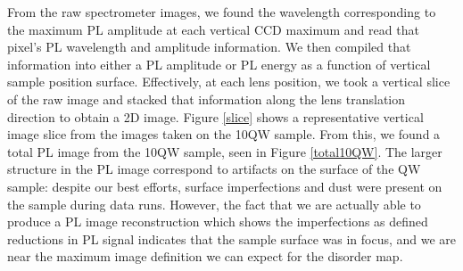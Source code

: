 \indent From the raw spectrometer images, we found the wavelength corresponding to the maximum PL amplitude at each vertical CCD maximum and read that pixel's PL wavelength and amplitude information. We then compiled that information into either a PL amplitude or PL energy as a function of vertical sample position surface. Effectively, at each lens position, we took a vertical slice of the raw image and stacked that information along the lens translation direction to obtain a 2D image. Figure \ref{slice} shows a representative vertical image slice from the images taken on the 10QW sample. From this, we found a total PL image from the 10QW sample, seen in Figure \ref{total10QW}. The larger structure in the PL image correspond to artifacts on the surface of the QW sample: despite our best efforts, surface imperfections and dust were present on the sample during data runs. However, the fact that we are actually able to produce a PL image reconstruction which shows the imperfections as defined reductions in PL signal indicates that the sample surface was in focus, and we are near the maximum image definition we can expect for the disorder map. 

